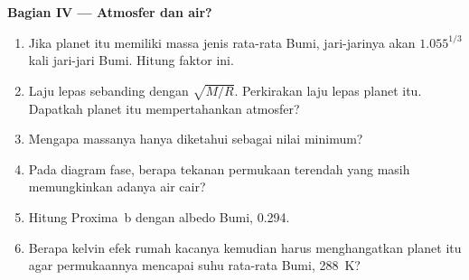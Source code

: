\begin{problem}
\medskip
\noindent\textbf{Bagian IV --- Atmosfer dan air?}
\begin{enumerate}[resume]
  \item Jika planet itu memiliki massa jenis rata-rata Bumi, jari-jarinya
        akan $1.055^{1/3}$ kali jari-jari Bumi. Hitung faktor ini.
  \item Laju lepas sebanding dengan $\sqrt{M/R}$. Perkirakan laju lepas
        planet itu. Dapatkah planet itu mempertahankan atmosfer?
  \item Mengapa massanya hanya diketahui sebagai nilai minimum?
  \item Pada diagram fase, berapa tekanan permukaan terendah yang masih
        memungkinkan adanya air cair?
  \item Hitung  Proxima~b dengan albedo Bumi, 0.294.
  \item Berapa kelvin efek rumah kacanya kemudian harus menghangatkan planet
        itu agar permukaannya mencapai suhu rata-rata Bumi,
        \qty{288}{K}?
\end{enumerate}
\end{problem}
